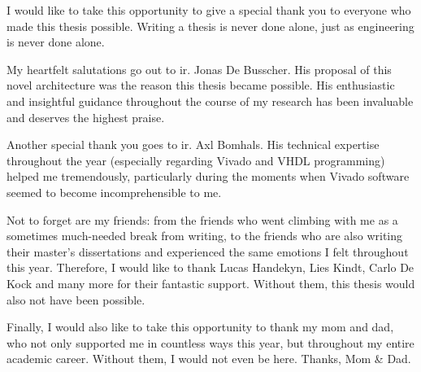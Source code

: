 I would like to take this opportunity to give a special thank you to everyone who made this thesis possible. Writing a thesis is never done alone, just as engineering is never done alone.

My heartfelt salutations go out to ir. Jonas De Busscher. His proposal of this novel architecture was the reason this thesis became possible. His enthusiastic and insightful guidance throughout the course of my research has been invaluable and deserves the highest praise.

Another special thank you goes to ir. Axl Bomhals. His technical expertise throughout the year (especially regarding Vivado and VHDL programming) helped me tremendously, particularly during the moments when Vivado software seemed to become incomprehensible to me.

Not to forget are my friends: from the friends who went climbing with me as a sometimes much-needed break from writing, to the friends who are also writing their master’s dissertations and experienced the same emotions I felt throughout this year. Therefore, I would like to thank Lucas Handekyn, Lies Kindt, Carlo De Kock and many more for their fantastic support. Without them, this thesis would also not have been possible.

Finally, I would also like to take this opportunity to thank my mom and dad, who not only supported me in countless ways this year, but throughout my entire academic career. Without them, I would not even be here. Thanks, Mom \& Dad.

